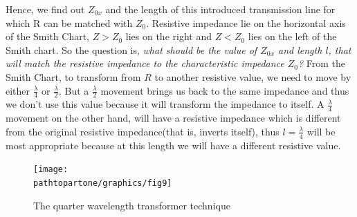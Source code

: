 Hence, we find out $ Z_{0x}$ and the length of this introduced transmission line for which R can be matched with $ Z_0$. Resistive impedance lie on the horizontal axis of the Smith Chart, $Z > Z_0$ lies on the right and $Z < Z_0$ lies on the left of the Smith chart. So the question is, \emph{what should be the value of $Z_{0x}$ and length $l$, that will match the resistive impedance to the characteristic impedance $Z_0$?} From the Smith Chart, to transform from $R$ to another resistive value, we need to move by either $ \frac{\lambda}{4}$ or $ \frac{\lambda}{2}$. But a $\frac{\lambda}{2}$ movement brings us back to the same impedance and thus we don't use this value because it will transform the impedance to itself. A $\frac{\lambda}{4}$ movement on the other hand, will have a resistive impedance which is different from the original resistive impedance(that is, inverts itself), thus $l = \frac{\lambda}{4} $ will be most appropriate because at this length we will have a different resistive value.
\begin{figure}[h]
\centering
\texttt{[image: \\pathtopartone/graphics/fig9]}
\caption{The quarter wavelength transformer technique}
\label{fig:fig9}
\end{figure}

